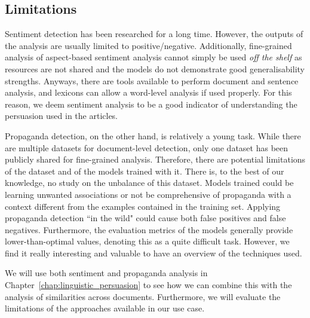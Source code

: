 \subsection{\statusgreen Limitations}

Sentiment detection has been researched for a long time.
However, the outputs of the analysis are usually limited to positive/negative.
Additionally, fine-grained analysis of aspect-based sentiment analysis cannot simply be used \emph{off the shelf} as resources are not shared and the models do not demonstrate good generalisability strengths.
Anyways, there are tools available to perform document and sentence analysis, and lexicons can allow a word-level analysis if used properly. For this reason, we deem sentiment analysis to be a good indicator of understanding the persuasion used in the articles.

Propaganda detection, on the other hand, is relatively a young task.
While there are multiple datasets for document-level detection, only one dataset has been publicly shared for fine-grained analysis.
Therefore, there are potential limitations of the dataset and of the models trained with it.
There is, to the best of our knowledge, no study on the unbalance of this dataset. Models trained could be learning unwanted associations or not be comprehensive of propaganda with a context different from the examples contained in the training set.
Applying propaganda detection ``in the wild" could cause both false positives and false negatives.
Furthermore, the evaluation metrics of the models generally provide lower-than-optimal values, denoting  this as a quite difficult task.
However, we find it really interesting and valuable to have an overview of the techniques used.

We will use both sentiment and propaganda analysis in Chapter~\ref{chap:linguistic_persuasion} to see how we can combine this with the analysis of similarities across documents.
Furthermore, we will evaluate the limitations of the approaches available in our use case.

